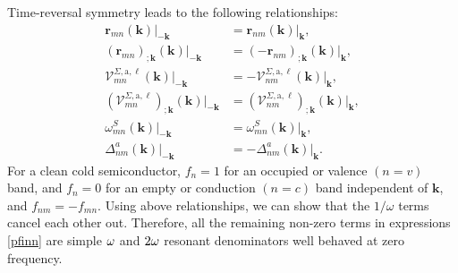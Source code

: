 Time-reversal symmetry leads to the following relationships:
\begin{align}\label{time_reversal}
\mathbf{r}_{mn}(\mathbf{k})|_{-\mathbf{k}}                                          &=  \mathbf{r}_{nm}(\mathbf{k})|_{\mathbf{k}},                                      \nonumber\\
(\mathbf{r}_{mn})_{;\mathbf{k}}(\mathbf{k})|_{-\mathbf{k}}                          &=  (-\mathbf{r}_{nm})_{;\mathbf{k}}(\mathbf{k})|_{\mathbf{k}},                     \nonumber\\
\mathcal{V}^{\Sigma,\text{a},\ell}_{mn}(\mathbf{k})|_{-\mathbf{k}}                       &=  -\mathbf{\mathcal{V}}_{nm}^{\Sigma,\text{a},\ell}(\mathbf{k})|_{\mathbf{k}},         \nonumber\\
(\mathcal{V}^{\Sigma,\text{a},\ell}_{mn})_{;\mathbf{k}}(\mathbf{k})|_{-\mathbf{k}}       &=  (\mathbf{\mathcal{V}}_{nm}^{\Sigma,\text{a},\ell})_{;\mathbf{k}}(\mathbf{k})|_{\mathbf{k}},   \\
\omega_{mn}^{S}(\mathbf{k})|_{-\mathbf{k}}                                          &=  \omega_{mn}^{S}(\mathbf{k})|_{\mathbf{k}},                                      \nonumber\\
\Delta^a_{nm}(\mathbf{k})|_{-\mathbf{k}}                                            &=  -\Delta^a_{nm}(\mathbf{k})|_{\mathbf{k}}.                                       \nonumber
\end{align}
For a clean cold semiconductor, $f_{n} = 1$ for an occupied 
or valence $(n = v)$ band, and $f_{n} = 0$ for an empty 
or conduction $(n = c)$ band independent of $\mathbf{k}$, 
and $f_{nm}=-f_{mn}$.
Using above relationships, we can show that 
the $1/\omega$ terms cancel each other out. 
Therefore, all the remaining non-zero terms in expressions \eqref{pfinn}
are simple $\omega$ and $2\omega$ resonant denominators well behaved at zero
frequency. 

